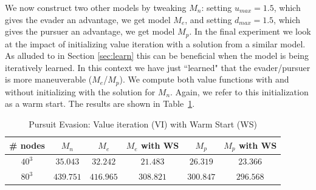 We now construct two other models by tweaking $M_n$: setting $u_{max}=1.5$, which gives the evader an advantage, we get model $M_e$, and setting $d_{max}=1.5$, which gives the pursuer an advantage,  we get model $M_p$. In the final experiment we look at the impact of initializing value iteration with a solution from a similar model. As alluded to in Section \ref{sec:learn} this can be beneficial when the model is being iteratively learned. In this context we have just ``learned" that the evader/pursuer is more maneuverable ($M_e$/$M_p$). We compute both value functions with and without initializing with the solution for $M_n$. Again, we refer to this initialization as a warm start. The results are shown in Table~\ref{tab:ws_pe}.

\begin{table}
\centering
\caption{Pursuit Evasion: Value iteration (VI) with Warm Start (WS)}
\begin{tabular}{|c| c| c| c| c| c|}
\hline
\# nodes & $M_n$ & $M_e$ &  $M_e$ with WS & $M_p$ & $M_p$ with WS \\ \hline
$40^3$ & $35.043$ & $32.242$ & $21.483$ & $26.319$ & $23.366$ \\ \hline
$80^3$ & $439.751$ & $416.965$ & $308.821$ & $300.847$ & $296.568$\\ \hline
\end{tabular}
\label{tab:ws_pe}
\end{table}
